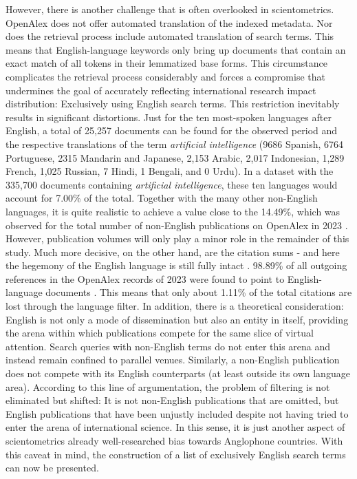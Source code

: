 \documentclass{article}
\begin{document}
	However, there is another challenge that is often overlooked in scientometrics. OpenAlex does not offer automated translation of the indexed metadata. Nor does the retrieval process include automated translation of search terms. This means that English-language keywords only bring up documents that contain an exact match of all tokens in their lemmatized base forms. This circumstance complicates the retrieval process considerably and forces a compromise that undermines the goal of accurately reflecting international research impact distribution: Exclusively using English search terms. This restriction inevitably results in significant distortions. Just for the ten most-spoken languages after English, a total of 25,257 documents can be found for the observed period and the respective translations of the term \textit{artificial intelligence} (9686 Spanish, 6764 Portuguese, 2315 Mandarin and Japanese, 2,153 Arabic, 2,017 Indonesian, 1,289 French, 1,025 Russian, 7 Hindi, 1 Bengali, and 0 Urdu). In a dataset with the 335,700 documents containing \textit{artificial intelligence}, these ten languages would account for 7.00\% of the total. Together with the many other non-English languages, it is quite realistic to achieve a value close to the 14.49\%, which was observed for the total number of non-English publications on OpenAlex in 2023 \cite{pradier2025smack}. However, publication volumes will only play a minor role in the remainder of this study. Much more decisive, on the other hand, are the citation sums - and here the hegemony of the English language is still fully intact \cite{dibitetti2017publish}. 98.89\% of all outgoing references in the OpenAlex records of 2023 were found to point to English-language documents \cite{pradier2025smack}. This means that only about 1.11\% of the total citations are lost through the language filter. In addition, there is a theoretical consideration: English is not only a mode of dissemination but also an entity in itself, providing the arena within which publications compete for the same slice of virtual attention. Search queries with non-English terms do not enter this arena and instead remain confined to parallel venues. Similarly, a non-English publication  does not compete with its English counterparts (at least outside its own language area). According to this line of argumentation, the problem of filtering is not eliminated but shifted: It is not non-English publications that are omitted, but English publications that have been unjustly included despite not having tried to enter the arena of international science. In this sense, it is just another aspect of scientometrics already well-researched bias towards Anglophone countries. With this caveat in mind, the construction of a list of exclusively English search terms can now be presented.
	
\end{document}
